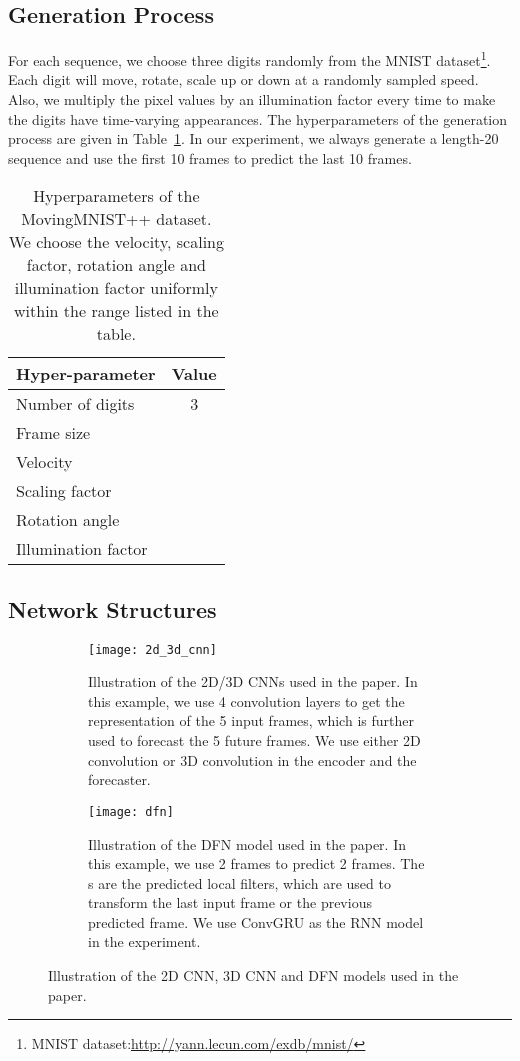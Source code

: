\documentclass{article}
\begin{document}
\subsection{Generation Process}
For each sequence, we choose three digits randomly from the MNIST dataset\footnote{MNIST dataset:\url{http://yann.lecun.com/exdb/mnist/}}. Each digit will move, rotate, scale up or down at a randomly sampled speed. Also, we multiply the pixel values by an illumination factor every time to make the digits have time-varying appearances. The hyperparameters of the generation process are given in Table~\ref{tbl:moving_mnist_pp}. In our experiment, we always generate a length-20 sequence and use the first 10 frames to predict the last 10 frames.
\begin{table}[h!]
  \vspace{-1em}
  \centering
  \caption{Hyperparameters of the MovingMNIST++ dataset. We choose the velocity, scaling factor, rotation angle and illumination factor uniformly within the range listed in the table.}
  \label{tbl:moving_mnist_pp}
  \begin{tabular}{lc}
    \toprule
    Hyper-parameter     & Value \\
    \midrule
    Number of digits    & 3 \\
    Frame size          &  \\
    Velocity            &                           \\
    Scaling factor      &                       \\
    Rotation angle      &  \\
    Illumination factor &                         \\
    \bottomrule
  \end{tabular}
  \vspace{-1em}
\end{table}
\subsection{Network Structures}
\begin{figure}[h!]
	\centering
	\begin{subfigure}[b!]{0.3\textwidth}
		\texttt{[image: 2d\_3d\_cnn]}
		\caption{Illustration of the 2D/3D CNNs used in the paper. In this example, we use 4 convolution layers to get the representation of the 5 input frames, which is further used to forecast the 5 future frames. We use either 2D convolution or 3D convolution in the encoder and the forecaster.}
		\label{fig:2d_3d}
	\end{subfigure}
	\qquad
	\begin{subfigure}[b!]{0.53\textwidth}
		\texttt{[image: dfn]}
		\caption{Illustration of the DFN model used in the paper. In this example, we use 2 frames to predict 2 frames. The s are the predicted local filters, which are used to transform the last input frame or the previous predicted frame. We use ConvGRU as the RNN model in the experiment.}
		\label{fig:dfn}
	\end{subfigure}
	\caption{Illustration of the 2D CNN, 3D CNN and DFN models used in the paper.}\label{fig:2d3ddfn}
\end{figure}
\end{document}
